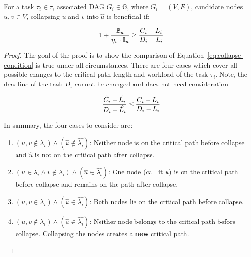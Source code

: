 \begin{theorem} For a task
  ${\tau_i \in \tau}$, associated DAG ${G_i \in \mathbb{G}}$,
  where ${G_i = (V, E)}$, candidate nodes ${u,v \in V}$,
  collapsing ${u}$ and ${v}$ into ${\hat{u}}$ is beneficial if:

  \begin{equation}
    \indent
    1 + \frac{\mathbb{B}_u}{\eta_v \cdot \mathbb{I}_u}
    \ge
    \frac{C_i - L_i}
         {D_i - L_i}
    \label{eq:condition}
  \end{equation}

  \begin{proof}
    The goal of the proof is to show the comparison of
    Equation~\ref{eq:collapse-condition} is true
    under all circumstances. There are four cases which cover all
    possible changes to the critical path length and workload of the
    task ${\tau_i}$. Note, the deadline of the task ${D_i}$ cannot
    be changed and does not need consideration. 

    \begin{equation} \label{eq:collapse-condition}
      \indent
      \frac{\hat{C_i} - \hat{L_i}}
           {D_i - \hat{L_i}} \le
      \frac{C_i - L_i}
           {D_i - L_i}
    \end{equation}

    In summary, the four cases to consider are:

    \begin{enumerate}
    \item ${(u, v \not \in \lambda_i)
      \land
      (\hat{u} \not \in \hat{\lambda_i})}$:
      Neither node is on the critical path before collapse and
      ${\hat{u}}$ is not on the critical path after collapse. 
    \item ${(u \in \lambda_i \land v \not \in \lambda_i)
      \land
      (\hat{u} \in \hat{\lambda_i})}$: One node (call it ${u}$)
      is on the critical path before collapse and remains on the path
      after collapse.
    \item ${(u,v \in \lambda_i) \land
      (\hat{u} \in \hat{\lambda_i})}$: Both nodes lie
      on the critical path before collapse.
    \item ${(u,v \not \in \lambda_i) \land
      (\hat{u} \in \hat{\lambda_i})}$: Neither node
      belongs to the critical path before collapse. Collapsing the
      nodes creates a \textbf{new} critical path.
    \end{enumerate}


\end{proof}
\end{theorem}
